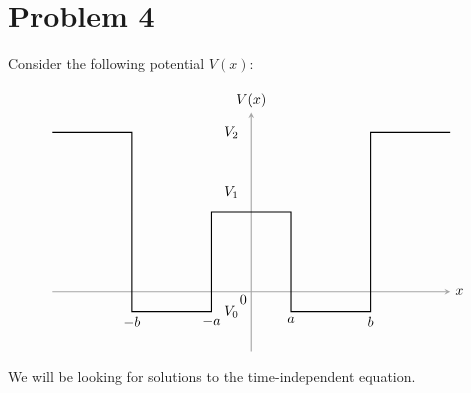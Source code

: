 \documentclass[10pt]{article}
\begin{document}
    \pagebreak
    \section*{Problem 4}

    Consider the following potential $V(x)$:

    \[\begin{tikzpicture}[scale=2]
        \draw[thick, gray!70, -stealth] (-2.5,0) -- (2.5,0) node[anchor=west, color=black] {$x$};
        \draw[thick, gray!70, -stealth] (0,-0.75) -- (0,2.25) node[anchor=south, color=black] {$V(x)$};
        \draw[thick] (-2.5,2) -- (-1.5,2) -- (-1.5,-0.25) node[anchor=north] {$-b$} -- (-0.5,-0.25) node[anchor=north] {$-a$} -- (-0.5,1) -- (0.5,1) -- (0.5,-0.25) node[anchor=north] {$a$} -- (1.5,-0.25) node[anchor=north] {$b$} -- (1.5,2) -- (2.5,2);
        \node at (-0.1,-0.1) (o) {$0$};
        \node at (-0.25,-0.25) (v) {$V_0$};
        \node at (-0.25,1.25) (vv) {$V_1$};
        \node at (-0.25,2) (vvv) {$V_2$};
      \end{tikzpicture}\]


    We will be looking for solutions to the time-independent \schrodinger equation. 
\end{document}
